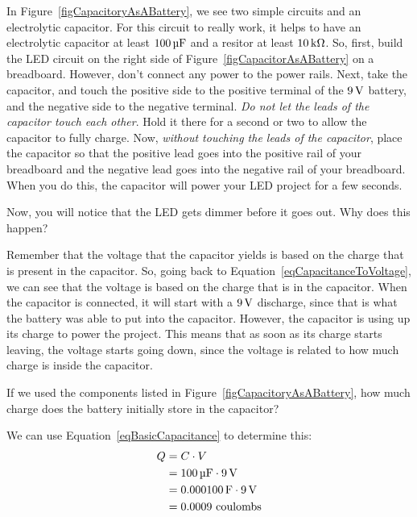 
In Figure~\ref{figCapacitoryAsABattery}, we see two simple circuits and an electrolytic capacitor.
For this circuit to really work, it helps to have an electrolytic capacitor at least $100\,\si{\micro\farad}$ and a resitor at least $10\,\si{\kilo\ohm}$.
So, first, build the LED circuit on the right side of Figure~\ref{figCapacitorAsABattery} on a breadboard.
However, don't connect any power to the power rails.
Next, take the capacitor, and touch the positive side to the positive terminal of the $9\,\si{\volt}$ battery, and the negative side to the negative terminal.
\emph{Do not let the leads of the capacitor touch each other}.
Hold it there for a second or two to allow the capacitor to fully charge.
Now, \emph{without touching the leads of the capacitor}, place the capacitor so that the positive lead goes into the positive rail of your breadboard and the negative lead goes into the negative rail of your breadboard.
When you do this, the capacitor will power your LED project for a few seconds.

Now, you will notice that the LED gets dimmer before it goes out.  
Why does this happen?

Remember that the voltage that the capacitor yields is based on the charge that is present in the capacitor.
So, going back to Equation~\ref{eqCapacitanceToVoltage}, we can see that the voltage is based on the charge that is in the capacitor.
When the capacitor is connected, it will start with a $9\,\si{\volt}$ discharge, since that is what the battery was able to put into the capacitor.
However, the capacitor is using up its charge to power the project.
This means that as soon as its charge starts leaving, the voltage starts going down, since the voltage is related to how much charge is inside the capacitor.

\begin{exampleprob}
If we used the components listed in Figure~\ref{figCapacitoryAsABattery}, how much charge does the battery initially store in the capacitor?

We can use Equation~\ref{eqBasicCapacitance} to determine this:
\begin{align*}
Q &= C\cdot V \\
  &= 100\,\si{\micro\farad}\cdot 9\,\si{\volt} \\
  &= 0.000100\,\si{\farad}\cdot 9\,\si{\volt} \\
  &= 0.0009 \textrm{ coulombs}
\end{align*}
\end{exampleprob}

